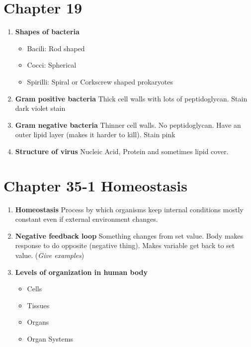 \documentclass[9pt]{article}
\begin{document}
\section*{Chapter 19}
\begin{enumerate}
  \item {\bf Shapes of bacteria}
    \begin{itemize}
    \item Bacili: Rod shaped
    \item Cocci: Spherical
    \item Spirilli: Spiral or Corkscrew shaped prokaryotes
    \end{itemize}
  \item {\bf Gram positive bacteria} Thick cell walls with lots of
    peptidoglycan.  Stain dark violet stain
  \item {\bf Gram negative bacteria} Thinner cell walls. No
    peptidoglycan. Have an outer lipid layer (makes it harder to
    kill). Stain pink
  \item {\bf Structure of virus} Nucleic Acid, Protein and sometimes
    lipid cover.
\end{enumerate}
\section*{Chapter 35-1 Homeostasis}
\begin{enumerate}
  \item {\bf Homeostasis} Process by which organisms keep internal
    conditions mostly constant even if external environment changes.
  \item {\bf Negative feedback loop} Something changes from set
    value. Body makes response to do opposite (negative thing). Makes
    variable get back to set value. ({\em Give examples})
  \item {\bf Levels of organization in human body}
    \begin{itemize}
    \item Cells
    \item Tissues
    \item Organs
    \item Organ Systems      
    \end{itemize}
\end{enumerate}
\end{document}

